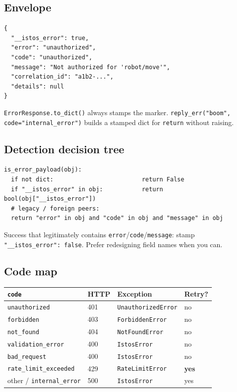 \documentclass[11pt,a4paper]{article}
\begin{document}
\subsection{Envelope}

\begin{lstlisting}[language={}]
{
  "__istos_error": true,
  "error": "unauthorized",
  "code": "unauthorized",
  "message": "Not authorized for 'robot/move'",
  "correlation_id": "a1b2-...",
  "details": null
}
\end{lstlisting}

\texttt{ErrorResponse.to\_dict()} always stamps the marker.
\texttt{reply\_err("boom", code="internal\_error")} builds a stamped dict for
\texttt{return} without raising.

\subsection{Detection decision tree}

\begin{lstlisting}[language={}]
is_error_payload(obj):
  if not dict:                         return False
  if "__istos_error" in obj:           return bool(obj["__istos_error"])
  # legacy / foreign peers:
  return "error" in obj and "code" in obj and "message" in obj
\end{lstlisting}

\begin{okbox}
Success that legitimately contains \texttt{error}/\texttt{code}/\texttt{message}:
stamp \texttt{"\_\_istos\_error": false}. Prefer redesigning field names when you can.
\end{okbox}

\subsection{Code map}

\begin{center}
\begin{tabular}{@{}llll@{}}
\toprule
\texttt{code} & HTTP & Exception & Retry? \\
\midrule
\texttt{unauthorized} & 401 & \texttt{UnauthorizedError} & no \\
\texttt{forbidden} & 403 & \texttt{ForbiddenError} & no \\
\texttt{not\_found} & 404 & \texttt{NotFoundError} & no \\
\texttt{validation\_error} & 400 & \texttt{IstosError} & no \\
\texttt{bad\_request} & 400 & \texttt{IstosError} & no \\
\texttt{rate\_limit\_exceeded} & 429 & \texttt{RateLimitError} & \textbf{yes} \\
other / \texttt{internal\_error} & 500 & \texttt{IstosError} & yes \\
\bottomrule
\end{tabular}
\end{center}
\end{document}
